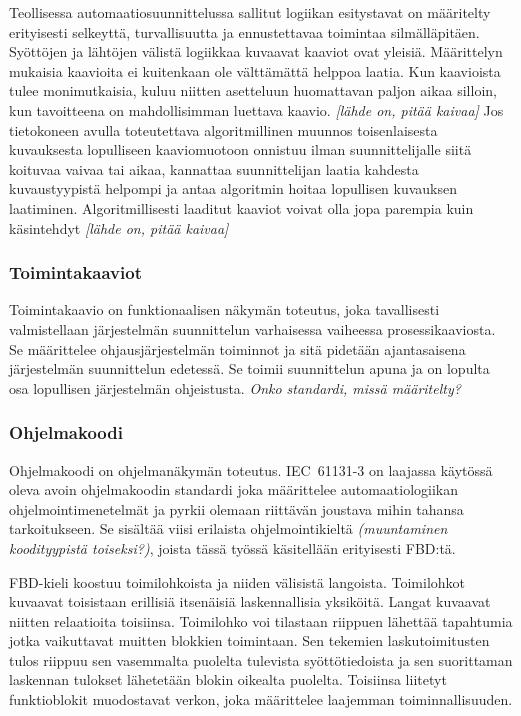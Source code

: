 \documentclass[finnish,12pt]{article}
\begin{document}
Teollisessa automaatiosuunnittelussa sallitut logiikan esitystavat on määritelty erityisesti selkeyttä, turvallisuutta ja ennustettavaa toimintaa silmälläpitäen.
Syöttöjen ja lähtöjen välistä logiikkaa kuvaavat kaaviot ovat yleisiä.
Määrittelyn mukaisia kaavioita ei kuitenkaan ole välttämättä helppoa laatia.
Kun kaavioista tulee monimutkaisia, kuluu niitten asetteluun huomattavan paljon aikaa silloin, kun tavoitteena on mahdollisimman luettava kaavio. \emph{[lähde on, pitää kaivaa]}
Jos tietokoneen avulla toteutettava algoritmillinen muunnos toisenlaisesta kuvauksesta lopulliseen kaaviomuotoon onnistuu ilman suunnittelijalle siitä koituvaa vaivaa tai aikaa,
kannattaa suunnittelijan laatia kahdesta kuvaustyypistä helpompi ja antaa algoritmin hoitaa lopullisen kuvauksen laatiminen.
Algoritmillisesti laaditut kaaviot voivat olla jopa parempia kuin käsintehdyt  \emph{[lähde on, pitää kaivaa]}


		\subsubsection{Toimintakaaviot}

Toimintakaavio on funktionaalisen näkymän toteutus, joka tavallisesti valmistellaan järjestelmän suunnittelun varhaisessa vaiheessa prosessikaaviosta.
Se määrittelee ohjausjärjestelmän toiminnot ja sitä pidetään ajantasaisena järjestelmän suunnittelun edetessä.
Se toimii suunnittelun apuna ja on lopulta osa lopullisen järjestelmän ohjeistusta.
\emph{Onko standardi, missä määritelty?}

		\subsubsection{Ohjelmakoodi}

Ohjelmakoodi on ohjelmanäkymän toteutus.
IEC~61131-3 on laajassa käytössä oleva avoin ohjelmakoodin standardi joka määrittelee automaatiologiikan ohjelmointimenetelmät ja pyrkii olemaan riittävän joustava mihin tahansa tarkoitukseen.
Se sisältää viisi erilaista ohjelmointikieltä \emph{(muuntaminen koodityypistä toiseksi?)}, joista tässä työssä käsitellään erityisesti FBD:tä. \cite{RefWorks:55}

FBD-kieli koostuu toimilohkoista ja niiden välisistä langoista.
Toimilohkot kuvaavat toisistaan erillisiä itsenäisiä laskennallisia yksiköitä.
Langat kuvaavat niitten relaatioita toisiinsa.
Toimilohko voi tilastaan riippuen lähettää tapahtumia jotka vaikuttavat muitten blokkien toimintaan.
Sen tekemien laskutoimitusten tulos riippuu sen vasemmalta puolelta tulevista syöttötiedoista ja sen suorittaman laskennan tulokset lähetetään blokin oikealta puolelta.
Toisiinsa liitetyt funktioblokit muodostavat verkon, joka määrittelee laajemman toiminnallisuuden.
\end{document}
